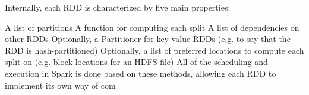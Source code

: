 Internally, each RDD is characterized by five main properties:

A list of partitions
A function for computing each split
A list of dependencies on other RDDs
Optionally, a Partitioner for key-value RDDs (e.g. to say that the RDD is hash-partitioned)
Optionally, a list of preferred locations to compute each split on (e.g. block locations for an HDFS file)
All of the scheduling and execution in Spark is done based on these methods, allowing each RDD to implement its own way of com